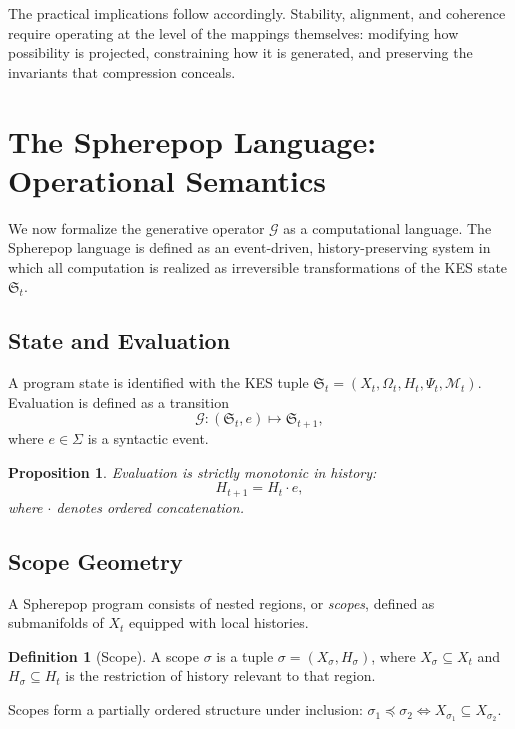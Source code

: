 \documentclass[11pt,a4paper]{article}
\newtheorem{proposition}[theorem]{Proposition}
\theoremstyle{definition}
\newtheorem{definition}[theorem]{Definition}
\theoremstyle{remark}
\begin{document}
The practical implications follow accordingly. Stability, alignment, and coherence require operating at the level of the mappings themselves: modifying how possibility is projected, constraining how it is generated, and preserving the invariants that compression conceals.

\appendix

\section{The Spherepop Language: Operational Semantics}

We now formalize the generative operator $\mathcal{G}$ as a computational language. The Spherepop language is defined as an event-driven, history-preserving system in which all computation is realized as irreversible transformations of the KES state $\mathfrak{S}_t$.

\subsection{State and Evaluation}

A program state is identified with the KES tuple $\mathfrak{S}_t = (X_t, \Omega_t, H_t, \Psi_t, \mathcal{M}_t)$. Evaluation is defined as a transition
\[
\mathcal{G} : (\mathfrak{S}_t, e) \mapsto \mathfrak{S}_{t+1},
\]
where $e \in \Sigma$ is a syntactic event.

\begin{proposition}
Evaluation is strictly monotonic in history:
\[
H_{t+1} = H_t \cdot e,
\]
where $\cdot$ denotes ordered concatenation.
\end{proposition}

\subsection{Scope Geometry}

A Spherepop program consists of nested regions, or \emph{scopes}, defined as submanifolds of $X_t$ equipped with local histories.

\begin{definition}[Scope]
A scope $\sigma$ is a tuple $\sigma = (X_\sigma, H_\sigma)$, where $X_\sigma \subseteq X_t$ and $H_\sigma \subseteq H_t$ is the restriction of history relevant to that region.
\end{definition}

Scopes form a partially ordered structure under inclusion: $\sigma_1 \preceq \sigma_2 \iff X_{\sigma_1} \subseteq X_{\sigma_2}$.
\end{document}
